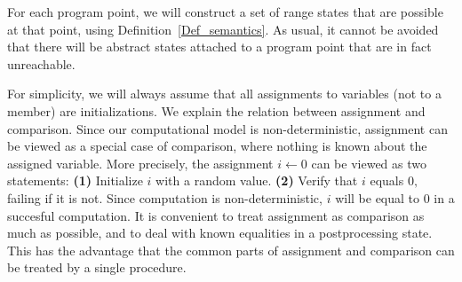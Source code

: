 For each program point, we will construct a set of
range states that are possible at that point,
using Definition~\ref{Def_semantics}.
As usual, it cannot be avoided that there will be abstract states
attached to a program point that are in fact unreachable.

\noindent
For simplicity, we will always assume that all assignments to
variables (not to a member) are initializations.
We explain the relation between assignment and
comparison. Since our computational model is non-deterministic,
assignment can be viewed as a special case of comparison,
where nothing is known about the assigned variable.
More precisely, the assignment $ i \leftarrow 0 $ can be viewed
as two statements: {\bf (1)} Initialize $ i $ with a random value.
{\bf (2)} Verify that $ i $ equals $ 0, $ failing if it is not.
Since computation is non-deterministic, $ i $ will be equal
to $ 0 $ in a succesful computation.
It is convenient to treat assignment as 
comparison as much as possible, and to deal with
known equalities in a postprocessing state. This has the advantage
that the common parts of assignment and comparison can be treated
by a single procedure.

